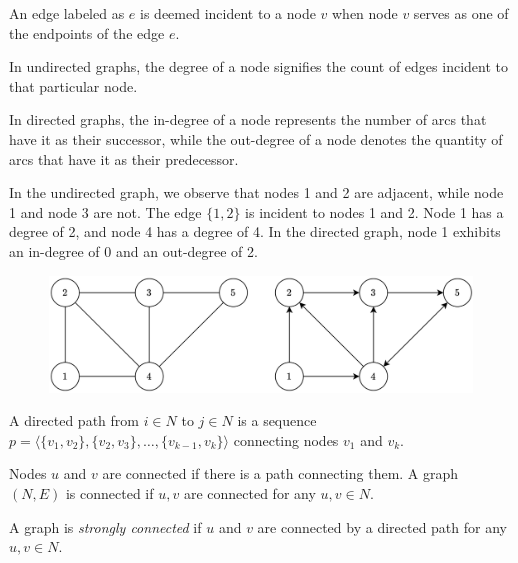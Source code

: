 \begin{definition}
    An edge labeled as $e$ is deemed incident to a node $v$ when node $v$ serves as one of the endpoints of the edge $e$.
\end{definition}
\begin{definition}   
    In undirected graphs, the degree of a node signifies the count of edges incident to that particular node. 
\end{definition}
\begin{definition}   
    In directed graphs, the in-degree of a node represents the number of arcs that have it as their successor, while the out-degree of a node denotes the quantity of arcs that have it as their predecessor.
\end{definition}
\begin{example}
    In the undirected graph, we observe that nodes 1 and 2 are adjacent, while node 1 and node 3 are not. 
    The edge $\{1,2\}$ is incident to nodes 1 and 2. 
    Node 1 has a degree of 2, and node 4 has a degree of 4.
    In the directed graph, node 1 exhibits an in-degree of 0 and an out-degree of 2.
    \begin{figure}[H]
        \centering
        \includegraphics[width=0.6\linewidth]{images/graph.png}
    \end{figure}
\end{example}
\begin{definition}
    A directed path from $i \in N$ to $j \in N$ is a sequence $p=\langle \{v_1,v_2\},\{v_2,v_3\},\dots,\{v_{k-1},v_k\}\rangle $ connecting nodes $v_1$ and $v_k$.
\end{definition}
\begin{definition}   
    Nodes $u$ and $v$ are connected if there is a path connecting them. 
    A graph $(N,E)$ is connected if $u,v$ are connected for any $u,v \in N$. 
\end{definition}
\begin{definition}      
    A graph is \emph{strongly connected} if $u$ and $v$ are connected by a directed path for any $u,v \in N$. 
\end{definition}
